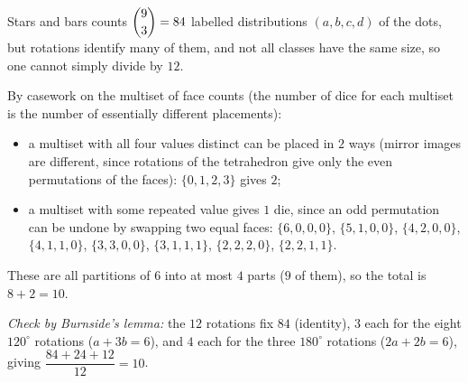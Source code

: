 Stars and bars counts $\dbinom{9}{3}=84$ labelled distributions $(a,b,c,d)$ of the dots, but rotations identify many of them, and not all classes have the same size, so one cannot simply divide by $12$.

By casework on the multiset of face counts (the number of dice for each multiset is the number of essentially different placements):
\begin{itemize}
\item a multiset with all four values distinct can be placed in $2$ ways (mirror images are different, since rotations of the tetrahedron give only the even permutations of the faces): $\{0,1,2,3\}$ gives $2$;
\item a multiset with some repeated value gives $1$ die, since an odd permutation can be undone by swapping two equal faces: $\{6,0,0,0\}$, $\{5,1,0,0\}$, $\{4,2,0,0\}$, $\{4,1,1,0\}$, $\{3,3,0,0\}$, $\{3,1,1,1\}$, $\{2,2,2,0\}$, $\{2,2,1,1\}$.
\end{itemize}
These are all partitions of $6$ into at most $4$ parts ($9$ of them), so the total is $8+2=\boxed{10}$.

\emph{Check by Burnside's lemma:} the $12$ rotations fix $84$ (identity), $3$ each for the eight $120^\circ$ rotations ($a+3b=6$), and $4$ each for the three $180^\circ$ rotations ($2a+2b=6$), giving $\dfrac{84+24+12}{12}=10$.
